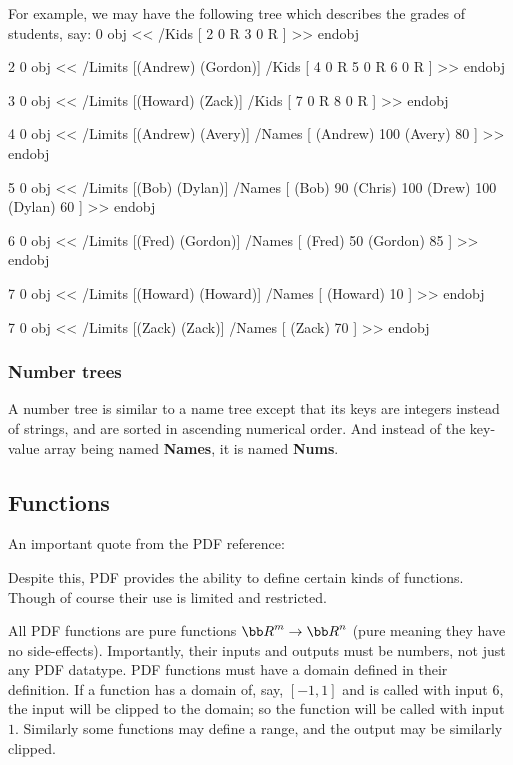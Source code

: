 For example, we may have the following tree which describes the grades of students, say:
 0 obj     %
<<
    /Kids
      [ 2 0 R
        3 0 R ]
>>
endobj

2 0 obj     %
<<
    /Limits [(Andrew) (Gordon)]
    /Kids
      [ 4 0 R
        5 0 R
        6 0 R ]
>> 
endobj

3 0 obj     %
<<
    /Limits [(Howard) (Zack)]
    /Kids
      [ 7 0 R
        8 0 R ]
>>
endobj

4 0 obj     %
<<
    /Limits [(Andrew) (Avery)]
    /Names
      [ (Andrew) 100
        (Avery) 80 ]
>>
endobj

5 0 obj     %
<<
    /Limits [(Bob) (Dylan)]
    /Names
      [ (Bob) 90
        (Chris) 100
        (Drew) 100
        (Dylan) 60 ]
>>
endobj

6 0 obj     %
<<
    /Limits [(Fred) (Gordon)]
    /Names
      [ (Fred) 50
        (Gordon) 85 ]
>>
endobj

7 0 obj     %
<<
    /Limits [(Howard) (Howard)]
    /Names
      [ (Howard) 10 ]
>>
endobj

7 0 obj     %
<<
    /Limits [(Zack) (Zack)]
    /Names
      [ (Zack) 70 ]
>>
endobj
\elisting

\subsubsection{Number trees}

A number tree is similar to a name tree except that its keys are integers instead of strings, and are
sorted in ascending numerical order.
And instead of the key-value array being named {\bf Names}, it is named {\bf Nums}.

\subsection{Functions}

An important quote from the PDF reference:


Despite this, PDF provides the ability to define certain kinds of functions.
Though of course their use is limited and restricted.

All PDF functions are pure functions ${\bb R}^m\to{\bb R}^n$ (pure meaning they have no side-effects).
Importantly, their inputs and outputs must be numbers, not just any PDF datatype.
PDF functions must have a domain defined in their definition.
If a function has a domain of, say, $[-1,1]$ and is called with input $6$, the input will be clipped to the
domain; so the function will be called with input $1$.
Similarly some functions may define a range, and the output may be similarly clipped.

